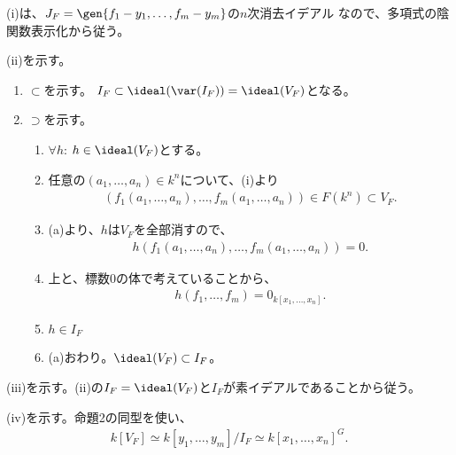 \begin{myproof}
  (i)は、$J_F=\gen{f_1-y_1,\dots,f_m-y_m}$の$n$次消去イデアル
  なので、多項式の陰関数表示化から従う。

  (ii)を示す。
  \begin{enumerate}
    \item $\subset$を示す。
    $I_F \subset \ideal(\var(I_F)) = \ideal(V_F)$となる。
    \item $\supset$を示す。
    \begin{enumerate}
      \item
      $\forall h$: $h\in \ideal(V_F)$とする。
      \item
      任意の$(a_1,\dots,a_n)\in k^n$について、(i)より
      \begin{align}
        (f_1(a_1,\dots,a_n),\dots,f_m(a_1,\dots,a_n))\in F(k^n) \subset V_F.
      \end{align}
      \item
      (a)より、$h$は$V_F$を全部消すので、
      \begin{align}
        h(f_1(a_1,\dots,a_n),\dots,f_m(a_1,\dots,a_n))=0.
      \end{align}
      \item
      上と、標数0の体で考えていることから、
      \begin{align}
        h(f_1,\dots,f_m) = 0_{k[x_1,\dots,x_n]}.
      \end{align}
      \item
      $h\in I_F$
      \item
      (a)おわり。$\ideal(V_F) \subset I_F$。
    \end{enumerate}
  \end{enumerate}

  (iii)を示す。(ii)の$I_F = \ideal(V_F)$と$I_F$が素イデアルであることから従う。

  (iv)を示す。命題2の同型を使い、
  \begin{align}
    k[V_F] \simeq k[y_1,\dots,y_m]/I_F \simeq k[x_1,\dots,x_n]^G.
  \end{align}

\end{myproof}

